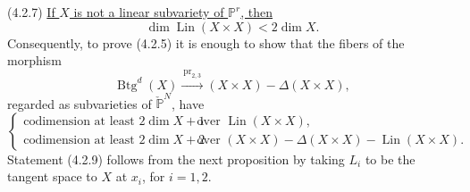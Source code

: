 \medskip
\noindent(4.2.7) \underline{If $X$ is not a linear subvariety of
$\mathbb P^r$, then}
\[
\dim\operatorname{Lin}(X\times X)<2\dim X.
\]
Consequently, to prove (4.2.5) it is enough to show that the fibers of
the morphism
\begin{equation}\tag{4.2.8}
\operatorname{Btg}^{d}(X)
\xrightarrow{\ \operatorname{pr}_{2,3}\ }
(X\times X)-\Delta(X\times X),
\end{equation}
regarded as subvarieties of $\check{\mathbb P}^{N}$, have
\begin{equation}\tag{4.2.9}
\left\{
\begin{array}{ll}
\text{codimension at least $2\dim X+1$}
 &\text{over $\operatorname{Lin}(X\times X)$},\\[1ex]
\text{codimension at least $2\dim X+2$}
 &\text{over $(X\times X)-\Delta(X\times X)
                 -\operatorname{Lin}(X\times X)$.}
\end{array}
\right.
\end{equation}
Statement (4.2.9) follows from the next proposition by taking $L_i$
to be the tangent space to $X$ at $x_i$, for $i=1,2$.

